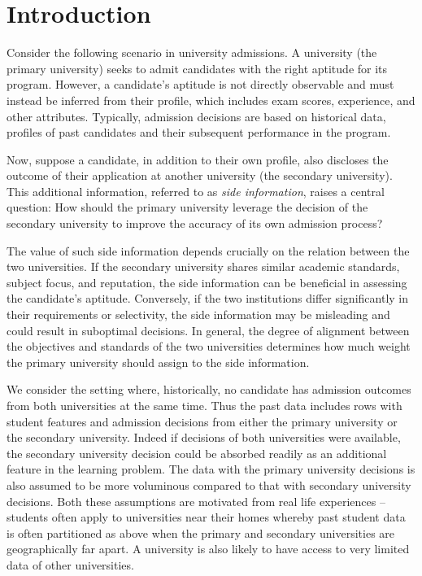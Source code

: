 \section{Introduction}
Consider the following scenario in university admissions. A university (the primary university) seeks to admit candidates with the right aptitude for its program. However, a candidate’s aptitude is not directly observable and must instead be inferred from their profile, which includes exam scores, experience, and other attributes. Typically, admission decisions are based on historical data, profiles of past candidates and their subsequent performance in the program.

Now, suppose a candidate, in addition to their own profile, also discloses the outcome of their application at another university (the secondary university). This additional information, referred to as \emph{side information}, raises a central question: How should the primary university leverage the decision of the secondary university to improve the accuracy of its own admission process?

The value of such side information depends crucially on the relation between the two universities. If the secondary university shares similar academic standards, subject focus, and reputation, the side information can be beneficial in assessing the candidate's aptitude. Conversely, if the two institutions differ significantly in their requirements or selectivity, the side information may be misleading and could result in suboptimal decisions. In general, the degree of alignment between the objectives and standards of the two universities determines how much weight the primary university should assign to the side information.

We consider the setting where, historically, no candidate has admission outcomes from both universities at the same time. Thus the past data includes rows with student features and admission decisions from either the primary university or the secondary university. Indeed if decisions of both universities were available, the secondary university decision could be absorbed readily as an additional feature in the learning problem. The data with the primary university decisions is also assumed to be more voluminous compared to that with secondary university decisions. Both these assumptions are motivated from real life experiences -- students often apply to universities near their homes whereby past student data is often partitioned as above when the primary and secondary universities are geographically far apart. A university is also likely to have access to very limited data of other universities.


